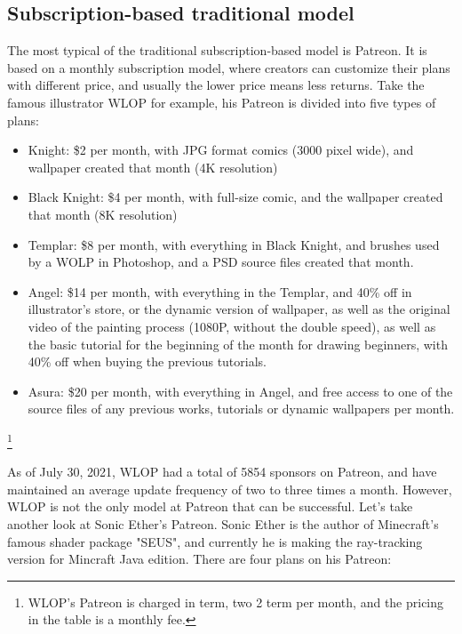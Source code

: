 \documentclass[12pt,a4paper]{article}
\begin{document}
    \subsection{Subscription-based traditional model}\label{subsec:tradition_patreon}

    The most typical of the traditional subscription-based model is Patreon.
    It is based on a monthly subscription model, where creators can customize
    their plans with different price, and usually the lower price means less returns.
    Take the famous illustrator WLOP for example, his Patreon is divided into five
    types of plans\cite{wlop_patreon}:
    \begin{itemize}
        \item Knight: \$2 per month, with JPG format comics (3000 pixel wide), and wallpaper created that month (4K resolution)
        \item Black Knight: \$4 per month, with full-size comic, and the wallpaper created that month (8K resolution)
        \item Templar: \$8 per month, with everything in Black Knight, and brushes used by a WOLP in Photoshop, and a PSD source files created that month.
        \item Angel: \$14 per month, with everything in the Templar, and 40\% off in illustrator's store, or the dynamic version of wallpaper, as well as the original video of the painting process (1080P, without the double speed), as well as the basic tutorial for the beginning of the month for drawing beginners, with 40\% off when buying the previous tutorials.
        \item Asura: \$20 per month, with everything in Angel, and free access to one of the source files of any previous works, tutorials or dynamic wallpapers per month.
    \end{itemize}\footnote{
        WLOP's Patreon is charged in term, two 2 term per month,
        and the pricing in the table is a monthly fee.
    }

    As of July 30, 2021, WLOP had a total of 5854 sponsors on Patreon, and have
    maintained an average update frequency of two to three times a month.
    However, WLOP is not the only model at Patreon that can be successful.
    Let's take another look at Sonic Ether's Patreon. Sonic Ether is the author
    of Minecraft's famous shader package "SEUS", and currently he is making the
    ray-tracking version for Mincraft Java edition. There are four plans on his
    Patreon\cite{seus_patreon}:
\end{document}
